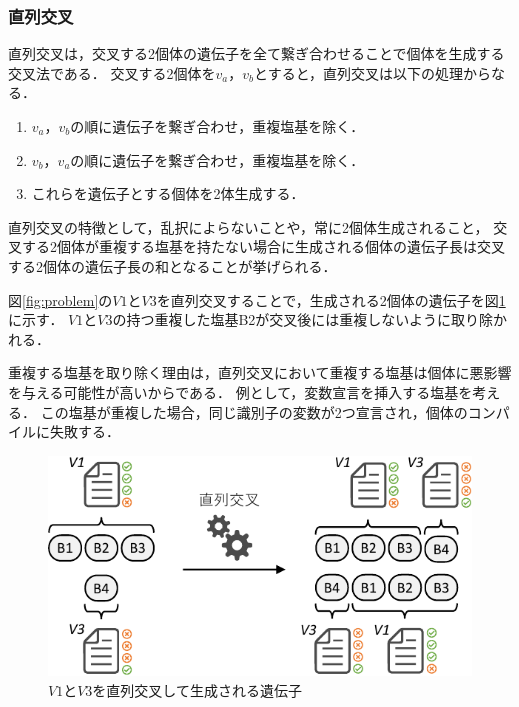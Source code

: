 \documentclass[uplatex,dvipdfmx,a4paper]{jsarticle}
\begin{document}
\subsubsection{直列交叉}
直列交叉は，交叉する2個体の遺伝子を全て繋ぎ合わせることで個体を生成する交叉法である．
交叉する2個体を$v_a$，$v_b$とすると，直列交叉は以下の処理からなる．

\begin{enumerate}
  \item $v_a$，$v_b$の順に遺伝子を繋ぎ合わせ，重複塩基を除く．
  \item $v_b$，$v_a$の順に遺伝子を繋ぎ合わせ，重複塩基を除く．
  \item これらを遺伝子とする個体を2体生成する．
\end{enumerate}

直列交叉の特徴として，乱択によらないことや，常に2個体生成されること，
交叉する2個体が重複する塩基を持たない場合に生成される個体の遺伝子長は交叉する2個体の遺伝子長の和となることが挙げられる．

図\ref{fig:problem}の$V1$と$V3$を直列交叉することで，生成される2個体の遺伝子を図\ref{fig:cco}に示す．
$V1$と$V3$の持つ重複した塩基B2が交叉後には重複しないように取り除かれる．

重複する塩基を取り除く理由は，直列交叉において重複する塩基は個体に悪影響を与える可能性が高いからである．
例として，変数宣言を挿入する塩基を考える．
この塩基が重複した場合，同じ識別子の変数が2つ宣言され，個体のコンパイルに失敗する．

\begin{figure}[t]
  \centering
  \includegraphics[width=\linewidth]{fig/cco.pdf}
  \caption{$V1$と$V3$を直列交叉して生成される遺伝子}
  \label{fig:cco}
\end{figure}
\end{document}

